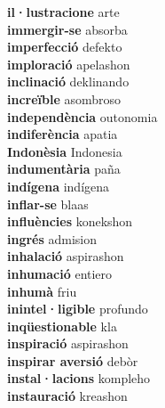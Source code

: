 \textbf{ il·lustracione  } arte \\
\textbf{ immergir-se  } absorba \\
\textbf{ imperfecció  } defekto \\
\textbf{ imploració  } apelashon \\
\textbf{ inclinació  } deklinando \\
\textbf{ increïble  } asombroso \\
\textbf{ independència  } outonomia \\
\textbf{ indiferència  } apatia \\
\textbf{ Indonèsia  } Indonesia \\
\textbf{ indumentària  } paña \\
\textbf{ indígena  } indígena \\
\textbf{ inflar-se  } blaas \\
\textbf{ influències  } konekshon \\
\textbf{ ingrés  } admision \\
\textbf{ inhalació  } aspirashon \\
\textbf{ inhumació  } entiero \\
\textbf{ inhumà  } friu \\
\textbf{ inintel·ligible  } profundo \\
\textbf{ inqüestionable  } kla \\
\textbf{ inspiració  } aspirashon \\
\textbf{ inspirar aversió  } debòr \\
\textbf{ instal·lacions  } kompleho \\
\textbf{ instauració  } kreashon \\
